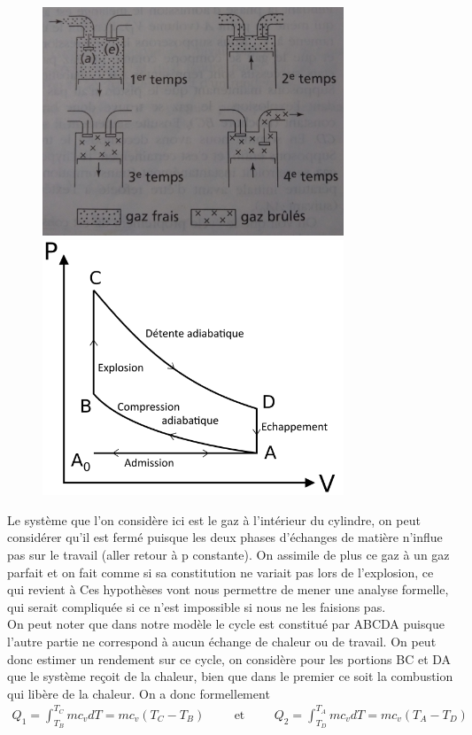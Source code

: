 \documentclass[12pt,prb,aps,epsf]{report}
\begin{document}
\begin{figure}[h]
	\centerline {\includegraphics[width=9cm]{moteur_4_temps}
				\includegraphics[width=9cm]{cycle_explosion} }
\end{figure}
Le système que l'on considère ici est le gaz à l'intérieur du cylindre, on peut considérer qu'il est fermé puisque les deux phases d'échanges de matière n'influe pas sur le travail (aller retour à p constante). On assimile de plus ce gaz à un gaz parfait et on fait comme si sa constitution ne variait pas lors de l'explosion, ce qui revient à Ces hypothèses vont nous permettre de mener une analyse formelle, qui serait compliquée si ce n'est impossible si nous ne les faisions pas.\\
On peut noter que dans notre modèle le cycle est constitué par ABCDA puisque l'autre partie ne correspond à aucun échange de chaleur ou de travail. On peut donc estimer un rendement sur ce cycle, on considère pour les portions BC et DA que le système reçoit de la chaleur, bien que dans le premier ce soit la combustion qui libère de la chaleur. On a donc formellement 
\begin{eqnarray}
Q_1 = \int_{T_B}^{T_C} m c_v dT = mc_v (T_C-T_B) \hspace{1cm}\mathrm{et}\hspace{1cm} Q_2 = \int_{T_D}^{T_A} m c_v dT = mc_v (T_A-T_D)
\end{eqnarray}
\end{document}
